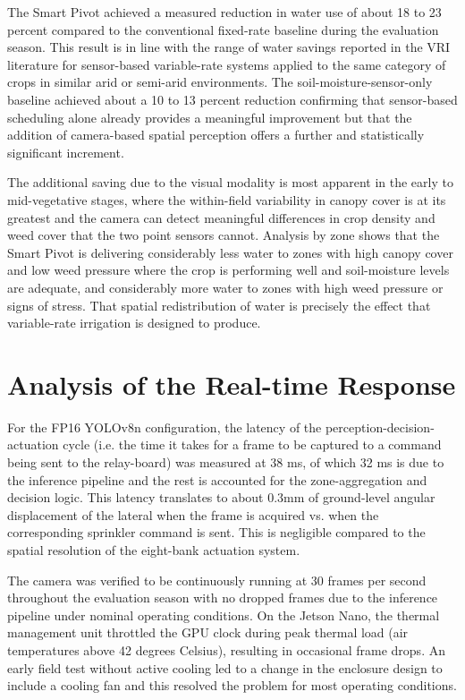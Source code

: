 \documentclass[12pt,a4paper]{report}
\begin{document}
The Smart Pivot achieved a measured reduction in water use of about 18 to 23 percent compared to the conventional fixed-rate baseline during the evaluation season. This result is in line with the range of water savings reported in the VRI literature for sensor-based variable-rate systems applied to the same category of crops in similar arid or semi-arid environments. The soil-moisture-sensor-only baseline achieved about a 10 to 13 percent reduction confirming that sensor-based scheduling alone already provides a meaningful improvement but that the addition of camera-based spatial perception offers a further and statistically significant increment.

The additional saving due to the visual modality is most apparent in the early to mid-vegetative stages, where the within-field variability in canopy cover is at its greatest and the camera can detect meaningful differences in crop density and weed cover that the two point sensors cannot. Analysis by zone shows that the Smart Pivot is delivering considerably less water to zones with high canopy cover and low weed pressure where the crop is performing well and soil-moisture levels are adequate, and considerably more water to zones with high weed pressure or signs of stress. That spatial redistribution of water is precisely the effect that variable-rate irrigation is designed to produce.

\section{Analysis of the Real-time Response}

For the FP16 YOLOv8n configuration, the latency of the perception-decision-actuation cycle (i.e. the time it takes for a frame to be captured to a command being sent to the relay-board) was measured at 38 ms, of which 32 ms is due to the inference pipeline and the rest is accounted for the zone-aggregation and decision logic. This latency translates to about 0.3mm of ground-level angular displacement of the lateral when the frame is acquired vs. when the corresponding sprinkler command is sent. This is negligible compared to the spatial resolution of the eight-bank actuation system.

The camera was verified to be continuously running at 30 frames per second throughout the evaluation season with no dropped frames due to the inference pipeline under nominal operating conditions. On the Jetson Nano, the thermal management unit throttled the GPU clock during peak thermal load (air temperatures above 42 degrees Celsius), resulting in occasional frame drops. An early field test without active cooling led to a change in the enclosure design to include a cooling fan and this resolved the problem for most operating conditions.
\end{document}
